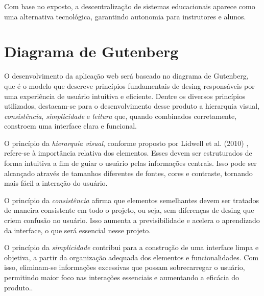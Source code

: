 Com base no exposto, a descentralização de sistemas educacionais aparece como uma alternativa tecnológica, garantindo autonomia para instrutores e alunos.


\section{Diagrama de Gutenberg}

O desenvolvimento da aplicação web será baseado no diagrama de Gutenberg, que é o modelo que descreve princípios fundamentais de desing responsáveis por uma experiência de usuário intuitiva e eficiente. Dentre os diversos princípios utilizados, destacam-se para o desenvolvimento desse produto a {hierarquia visual}, \textit{consistência}, \textit{simplicidade} e \textit{leitura} que, quando combinados corretamente, constroem uma interface clara e funcional.

O princípio da \textit{hierarquia visual}, conforme proposto por  Lidwell et al. (2010) \cite{lidwell2010}, refere-se à importância relativa dos elementos. Esses devem ser estruturados de forma intuitiva a fim de guiar o usuário pelas informações centrais. Isso pode ser alcançado através de tamanhos diferentes de fontes, cores  e contraste, tornando mais fácil a interação do usuário.

O princípio da \textit{consistência} afirma que elementos semelhantes devem ser tratados de maneira consistente em todo o projeto, ou seja, sem diferenças de desing que criem confusão no usuário. Isso aumenta a previsibilidade e acelera o aprendizado da interface, o que será essencial nesse projeto.

O princípio da \textit{simplicidade} contribui para a construção de uma interface limpa e objetiva, a partir da organização adequada dos elementos e funcionalidades. Com isso, eliminam-se informações excessivas que possam sobrecarregar o usuário, permitindo maior foco nas interações essenciais e aumentando a eficácia do produto..

